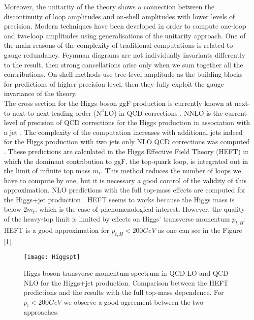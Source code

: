 Moreover, the unitarity of the theory shows a connection between the discontinuity of loop amplitudes and on-shell amplitudes with lower levels of precision.
Modern techniques have been developed in order to compute one-loop and two-loop amplitudes using generalisations of the unitarity approach. One of the main reasons of the complexity of traditional computations is related to gauge redundancy. Feynman diagrams are not individually invariants differently to the result, then strong cancellations arise only when we sum together all the contributions. On-shell methods use tree-level amplitude as the building blocks for predictions of higher precision level, then they fully exploit the gauge invariance of the theory.\\

The cross section for the Higgs boson ggF production is currently known at next-to-next-to-next leading order ($\text{N}^3\text{LO}$) in QCD corrections \cite{Anastasiou_2015}. NNLO is the current level of precision of QCD corrections for the Higgs production in association with a jet \cite{Boughezal_2015}. The complexity of the computation increases with additional jets indeed for the Higgs production with two jets only NLO QCD corrections was computed \cite{an_Deurzen_2013}. These predictions are calculated in the Higgs Effective Field Theory (HEFT) in which the dominant contribution to ggF, the top-quark loop, is integrated out in the limit of infinite top mass $m_t$. This method reduces the number of loops we have to compute by one, but it is necessary a good control of the validity of this approximation. NLO predictions with the full top-mass effects are computed for the Higgs+jet production \cite{Harlander_2012, Jones_2018}. HEFT seems to works because the Higgs mass is below $2m_t$, which is the case of phenomenological interest. However, the quality of the heavy-top limit is limited by effects on Higgs' transverse momentum $p_{t,H}$: HEFT is a good approximation for $p_{t,H}<200 GeV$ as one can see in the Figure [\ref{fig:pt}]. 
\begin{figure}[H]
\begin{center}
\texttt{[image: Higgspt]}
\caption{Higgs boson transverse momentum spectrum in QCD LO and QCD NLO for the Higgs+jet production. Comparison between the HEFT predictions and the results with the full top-mass dependence. For $p_t<200 GeV$ we observe a good agreement between the two approaches. \cite{Jones_2018}}
\label{fig:pt}
\end{center}
\end{figure}

